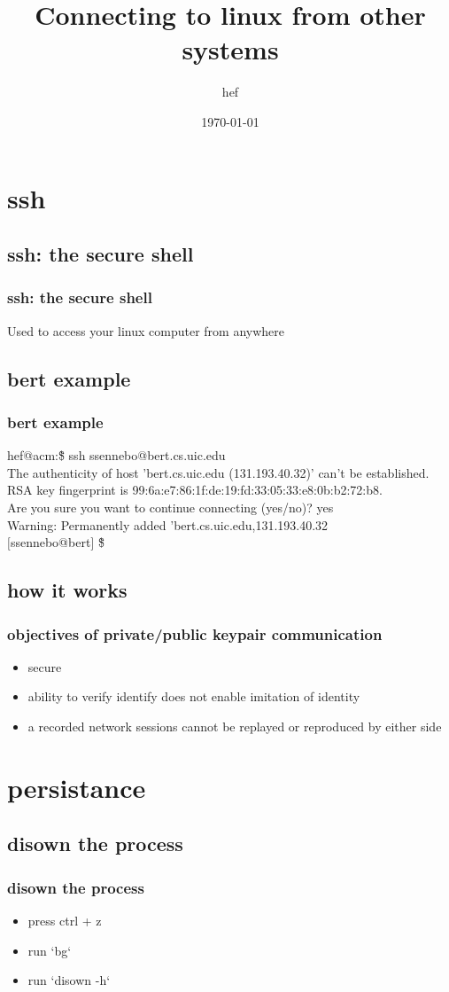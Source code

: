 \documentclass[hyperref={pdfpagelabels=false}]{beamer}
\title{Connecting to linux from other systems}
\author{hef}
\date{\today}
\begin{document}
\frame{\titlepage}
\section[outline]{}
\frame{\tableofcontents}
\section{ssh}
\subsection{ssh: the {\bf s}ecure {\bf sh}ell}
\frame
{
  \frametitle{ssh: the secure shell}
  Used to access your linux computer from anywhere
}
\subsection{bert example}
\frame
{
  \frametitle{bert example}
  hef@acm:\~\$ ssh ssennebo@bert.cs.uic.edu\\
  The authenticity of host 'bert.cs.uic.edu (131.193.40.32)' can't be established.\\
  RSA key fingerprint is 99:6a:e7:86:1f:de:19:fd:33:05:33:e8:0b:b2:72:b8.\\
  Are you sure you want to continue connecting (yes/no)? yes\\
  Warning: Permanently added 'bert.cs.uic.edu,131.193.40.32\\
  $[$ssennebo@bert$]$ \~\$
}
\subsection{how it works}
\frame
{
  \frametitle{objectives of private/public keypair communication}
  \begin{itemize}
  \item{secure}
  \item{ability to verify identify does not enable imitation of identity}
  \item{a recorded network sessions cannot be replayed or reproduced by either side}
  \end{itemize}
}
\section{persistance}
\subsection{disown the process}
\frame
{
  \frametitle{disown the process}
  \begin{itemize}
  \item{press ctrl + z}
  \item{run `bg`}
  \item{run `disown -h`}
  \end{itemize}
}
\end{document}
